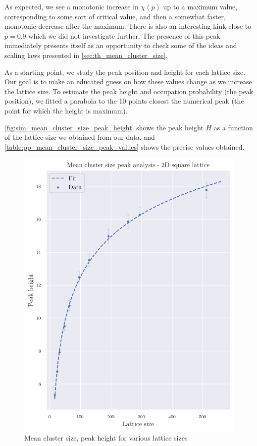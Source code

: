 As expected, we see a monotonic increase in $\chi(p)$ up to a maximum value, corresponding to some sort of critical value, and then a somewhat faster, monotonic decrease after the maximum. There is also an interesting kink close to $p=0.9$ which we did not investigate further.
The presence of this peak immediately presents itself as an opportunity to check some of the ideas and scaling laws presented in \autoref{sec:th_mean_cluster_size}. 


As a starting point, we study the peak position and height for each lattice size. Our goal is to make an educated guess on how these values change as we increase the lattice size. To estimate the peak height and occupation probability (the peak position), we fitted a parabola to the 10 points closest the numerical peak (the point for which the height is maximum).

\autoref{fig:sim_mean_cluster_size_peak_height} shows the peak height $H$ as a function of the lattice size we obtained from our data, and \autoref{table:pp_mean_cluster_size_peak_values} shows the precise values obtained.

\begin{figure}[H]
  \includegraphics[width=\linewidth]{Images/sim_mean_cluster_size_peak_height.png}
  \caption{Mean cluster size, peak height for various lattice sizes}
  \label{fig:sim_mean_cluster_size_peak_height}
\end{figure}

